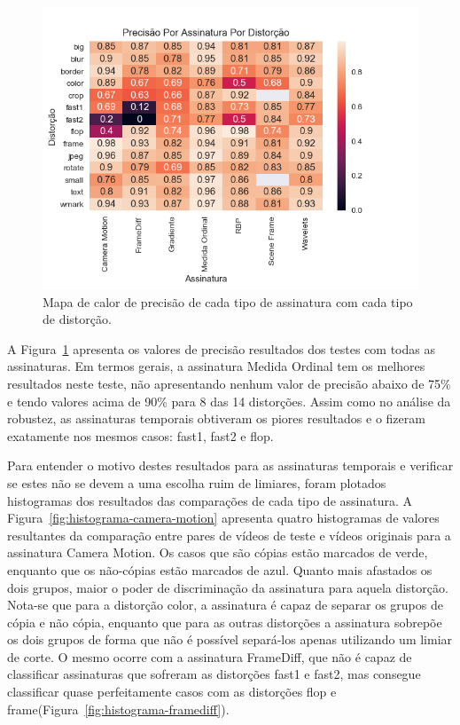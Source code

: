\begin{figure}[h]
	\centering
	\caption{Mapa de calor de precisão de cada tipo de assinatura com cada tipo de distorção.}
	\label{fig:heatmap-precisao}
	\includegraphics[width=\textwidth]{dados/figuras/experimentos/heatmap_final_precisao.png}	
\end{figure}

A Figura~\ref{fig:heatmap-precisao} apresenta os valores de precisão resultados dos testes com todas as assinaturas. Em termos gerais, a assinatura Medida Ordinal tem os melhores resultados neste teste, não apresentando nenhum valor de precisão abaixo de 75\% e tendo valores acima de 90\% para 8 das 14 distorções. Assim como no análise da robustez, as assinaturas temporais obtiveram os piores resultados e o fizeram exatamente nos mesmos casos: fast1, fast2 e flop. 

Para entender o motivo destes resultados para as assinaturas temporais e verificar se estes não se devem a uma escolha ruim de limiares, foram plotados histogramas dos resultados das comparações de cada tipo de assinatura. A Figura~\ref{fig:histograma-camera-motion} apresenta quatro histogramas de valores resultantes da comparação entre pares de vídeos de teste e vídeos originais para a assinatura Camera Motion. Os casos que são cópias estão marcados de verde, enquanto que os não-cópias estão marcados de azul. Quanto mais afastados os dois grupos, maior o poder de discriminação da assinatura para aquela distorção. Nota-se que para a distorção color, a assinatura é capaz de separar os grupos de cópia e não cópia, enquanto que para as outras distorções a assinatura sobrepõe os dois grupos de forma que não é possível separá-los apenas utilizando um limiar de corte. O mesmo ocorre com a assinatura FrameDiff, que não é capaz de classificar assinaturas que sofreram as distorções fast1 e fast2, mas consegue classificar quase perfeitamente casos com as distorções flop e frame(Figura~\ref{fig:histograma-framediff}).

